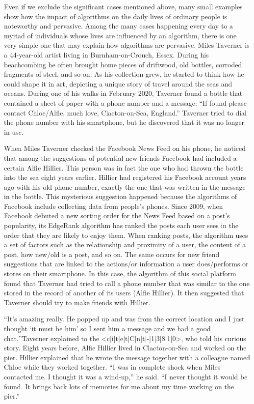Even if we exclude the significant cases mentioned above, many small examples show how the impact of algorithms on the daily lives of ordinary people is \hbox{noteworthy} and pervasive. Among the many cases happening every day to a \hbox{myriad} of individuals whose lives are influenced by an algorithm, there is one very simple one that may explain how algorithms are pervasive. Miles Taverner is a 44-year-old artist living in Burnham-on-Crouch, Essex. During his beachcombing he often brought home pieces of driftwood, old bottles, corroded fragments of steel, and so on. As his collection grew, he started to think how he could shape it in art, depicting a unique story of travel around the seas and oceans. During one of his walks in February 2020, Taverner found a bottle that contained a sheet of paper with a phone number and a message: ``If found please contact Chloe/Alfie, much love, Clacton-on-Sea, England.'' Taverner tried to dial the phone number with his smartphone, but he discovered that it was no longer in use.

When Miles Taverner checked the Facebook News Feed on his phone, he noticed that among the suggestions of potential new friends Facebook had included a certain Alfie Hillier. This person was in fact the one who had thrown the bottle into the sea eight years earlier. Hillier had registered his Facebook account years ago with his old phone number, exactly the one that was written in the message in the bottle. This mysterious suggestion happened because the algorithms of Facebook include collecting data from people's phones. Since 2009, when Facebook debuted a new sorting order for the News Feed based on a post's popularity, its EdgeRank algorithm has ranked the posts each user sees in the order that they are likely to enjoy them. When ranking posts, the algorithm uses a set of factors such as the relationship and proximity of a user, the content of a post, how new/old is a post, and so on. The same occurs for new friend suggestions that are linked to the actions/or information a user does/performs or stores on their smartphone. In this case, the algorithm of this social platform found that Taverner had tried to call a phone number that was similar to the one stored in the record of another of its users (Alfie Hillier). It then suggested that Taverner should try to make friends with Hillier.

``It's amazing really. He popped up and was from the correct location and I just thought `it must be him' so I sent him a message and we had a good chat,''\break Taverner explained to the <c|i|t|e|t|C|n|t|-|1|3|8|1|0>, who told his curious story. Eight years before, Alfie Hillier lived in Clacton-on-Sea and worked on the pier. Hillier explained that he wrote the message together with a colleague named Chloe while they worked together. ``I was in complete shock when Miles contacted me. I thought it was a wind-up,'' he said. ``I never thought it would be found. It brings back lots of memories for me about my time working on the pier.''


